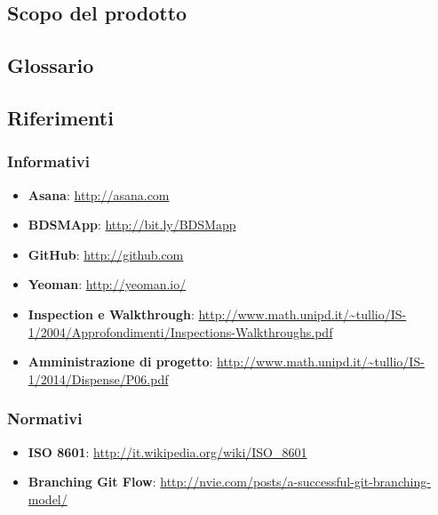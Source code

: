 	\subsection{Scopo del prodotto}
		\productScope

	\subsection{Glossario}
		\glossarioDesc

	\subsection{Riferimenti}
		\subsubsection{Informativi}
		\begin{itemize}
			\item \textbf{ Asana}: \url{http://asana.com}
			\item \textbf{BDSMApp}: \url{http://bit.ly/BDSMapp}
			\item \textbf{GitHub}: \url{http://github.com}
			\item \textbf{Yeoman}: \url{http://yeoman.io/}
			\item \textbf{Inspection e Walkthrough}: \url{http://www.math.unipd.it/~tullio/IS-1/2004/Approfondimenti/Inspections-Walkthroughs.pdf}
			\item \textbf{Amministrazione di progetto}: \url{http://www.math.unipd.it/~tullio/IS-1/2014/Dispense/P06.pdf}
		\end{itemize}

		\subsubsection{Normativi}
		\begin{itemize}
			\item \textbf{ISO 8601}: \url{http://it.wikipedia.org/wiki/ISO_8601}
			\item \textbf{Branching Git Flow}: \url{http://nvie.com/posts/a-successful-git-branching-model/}
		\end{itemize}